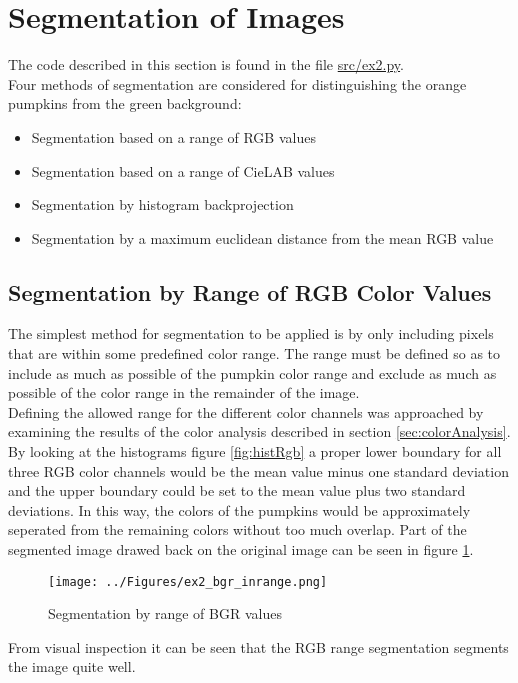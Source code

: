 \documentclass[../Head/Main.tex]{subfiles}
\begin{document}
\section{Segmentation of Images}
The code described in this section is found in the file \url{src/ex2.py}.\\
Four methods of segmentation are considered for distinguishing the orange pumpkins from the green background:
\begin{itemize}
\item Segmentation based on a range of RGB values
\item Segmentation based on a range of CieLAB values
\item Segmentation by histogram backprojection
\item Segmentation by a maximum euclidean distance from the mean RGB value
\end{itemize}

\subsection{Segmentation by Range of RGB Color Values}
The simplest method for segmentation to be applied is by only including pixels that are within some predefined color range. The range must be defined so as to include as much as possible of the pumpkin color range and exclude as much as possible of the color range in the remainder of the image.\\
Defining the allowed range for the different color channels was approached by examining the results of the color analysis described in section \ref{sec:colorAnalysis}. By looking at the histograms figure \ref{fig:histRgb} a proper lower boundary for all three RGB color channels would be the mean value minus one standard deviation and the upper boundary could be set to the mean value plus two standard deviations. In this way, the colors of the pumpkins would be approximately seperated from the remaining colors without too much overlap. Part of the segmented image drawed back on the original image can be seen in figure \ref{fig:bgrSeg}.

\begin{figure}[H]
\centering
\texttt{[image: ../Figures/ex2\_bgr\_inrange.png]}
\caption{Segmentation by range of BGR values}
\label{fig:bgrSeg}
\end{figure}

From visual inspection it can be seen that the RGB range segmentation segments the image quite well. 
\end{document}
